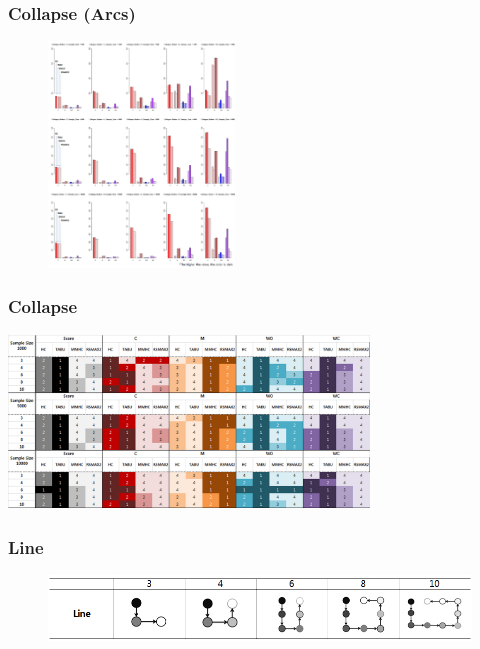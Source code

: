 \documentclass{beamer}
\begin{document}
\begin{frame}
\frametitle{Collapse (Arcs)}
{\scriptsize{}
	\begin{figure}
		\includegraphics[height=170pt]{images/01_Collapse_Arcs}
	\end{figure}	
}
\end{frame}



\begin{frame}
\frametitle{Collapse}
{\scriptsize{}
	\begin{center}
		\includegraphics[height=130pt]{images/Result_Collapse}
	\end{center}
}
\end{frame}



\begin{frame}
\frametitle{Line}
{\scriptsize{}
	\begin{figure}
		\includegraphics[height=50pt]{images/Topologies_Line}
	\end{figure}	
}
\end{frame}
\end{document}

